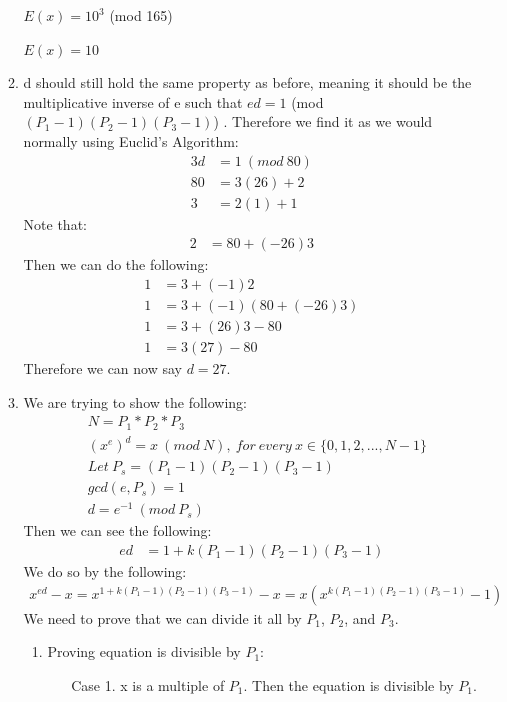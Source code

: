 \documentclass[12pt,fleqn]{article}
\begin{document}
\begin{enumerate}
\begin{enumerate}
	$E(x) = 10^{3}$ (mod 165)
	
	$E(x) = 10$
    
    \item 
    d should still hold the same property as before, meaning it should be the multiplicative inverse of e such that $ed = 1$ (mod $(P_1-1)(P_2-1)(P_3-1)$) . Therefore we find it as we would normally using Euclid's Algorithm:
    \begin{align*}
    		3d &= 1 \: (mod \: 80) \\
    		80 &= 3(26) + 2 \\
    		3 &= 2(1) + 1
    \end{align*}
	Note that:
	\begin{align*}
    		2 &= 80 + (-26)3
    \end{align*}
    Then we can do the following:
    \begin{align*}
    		1 &= 3 + (-1)2 \\
    		1 &= 3 + (-1)(80 + (-26)3) \\
    		1 &= 3 + (26)3 - 80 \\
    		1 &= 3(27) - 80
    \end{align*}
    Therefore we can now say $d = 27$.
    \item
    We are trying to show the following:
    \begin{align*}
		&N = P_1 * P_2 * P_3 \\ 
    		&(x^{e})^{d} = x \: (mod \: N), \: for \: every \: x \in \{0, 1, 2, ..., N -1\}  \\
    		&Let \: P_s = (P_1-1)(P_2-1)(P_3-1)  \\
    		&gcd(e, P_s) = 1 \\
    		&d = e^{-1} \: (mod \: P_s)	
    \end{align*}
    Then we can see the following:
    \begin{align*}
		ed &= 1 + k(P_1-1)(P_2-1)(P_3-1)
    \end{align*}
    We do so by the following:
    \begin{align*}
		x^{ed} - x = x^{1 + k(P_1-1)(P_2-1)(P_3-1)} - x = x(x^{k(P_1-1)(P_2-1)(P_3-1)} - 1)
    \end{align*}
    We need to prove that we can divide it all by $P_1$, $P_2$, and $P_3$.
    \begin{enumerate}
    		\item Proving equation is divisible by $P_1$:
    		\begin{enumerate}
    			\item[Case 1.] x is a multiple of $P_1$. Then the equation is divisible by $P_1$.

\end{enumerate}
\end{enumerate}
\end{enumerate}
\end{enumerate}
\end{document}
